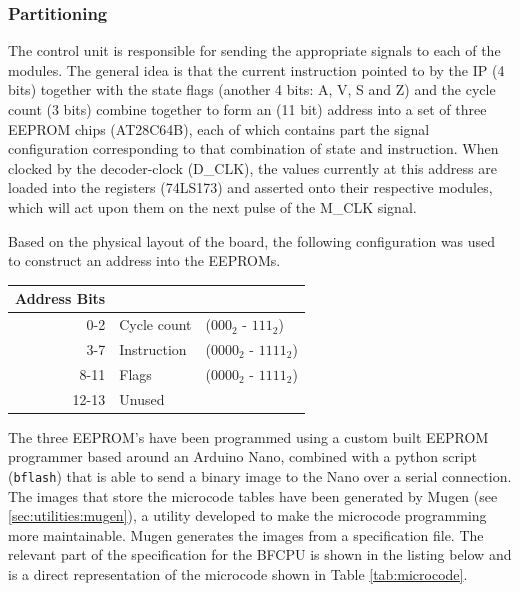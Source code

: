 \subsubsection{Partitioning}
The control unit is responsible for sending the appropriate signals to each of the modules. The general idea is that the current instruction pointed to by the IP (4 bits) together with the state flags (another 4 bits: A, V, S and Z) and the cycle count (3 bits) combine together to form an (11 bit) address into a set of three EEPROM chips (AT28C64B), each of which contains part the signal configuration corresponding to that combination of state and instruction. When clocked by the decoder-clock (D\_CLK), the values currently at this address are loaded into the registers (74LS173) and asserted onto their respective modules, which will act upon them on the next pulse of the M\_CLK signal.

Based on the physical layout of the board, the following configuration was used to construct an address into the EEPROMs.
\\
\begin{center}
\begin{tabular}{r|ll} 
  Address Bits & \\ \hline
  0-2  & Cycle count & ($000_2$ - $111_2$) \\
  3-7  & Instruction & ($0000_2$ - $1111_2$) \\
  8-11 & Flags & ($0000_2$ - $1111_2$) \\
  12-13 & Unused & 
\end{tabular}
\end{center}

The three EEPROM's have been programmed using a custom built EEPROM programmer based around an Arduino Nano, combined with a python script (\texttt{bflash}) that is able to send a binary image to the Nano over a serial connection. The images that store the microcode tables have been generated by Mugen (see \ref{sec:utilities:mugen}), a utility developed to make the microcode programming more maintainable. Mugen generates the images from a specification file. The relevant part of the specification for the BFCPU is shown in the listing below and is a direct representation of the microcode shown in Table \ref{tab:microcode}.




